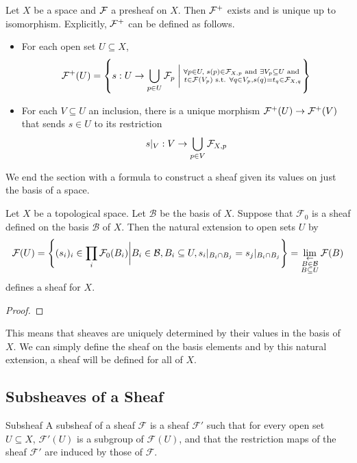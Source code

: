 \documentclass[a4paper]{article}
\begin{document}
\begin{thm}{}{} Let $X$ be a space and $\mathcal{F}$ a presheaf on $X$. Then $\mathcal{F}^+$ exists and is unique up to isomorphism. Explicitly, $\mathcal{F}^+$ can be defined as follows. 
\begin{itemize}
\item For each open set $U\subseteq X$, $$\mathcal{F}^+(U)=\left\{s:U\to\bigcup_{p\in U}\mathcal{F}_p\;\bigg{|}\;\substack{\forall p\in U,\;s(p)\in\mathcal{F}_{X,p}\text{ and }\exists V_p\subseteq U\text{ and }\\t\in\mathcal{F}(V_p)\text{ s.t. }\forall q\in V_p, s(q)=t_q\in\mathcal{F}_{X,q}}\right\}$$
\item For each $V\subseteq U$ an inclusion, there is a unique morphism $\mathcal{F}^+(U)\to\mathcal{F}^+(V)$ that sends $s\in U$ to its restriction $$s|_V:V\to\bigcup_{p\in V}\mathcal{F}_{X,p}$$
\end{itemize}
\end{thm}

We end the section with a formula to construct a sheaf given its values on just the basis of a space. 

\begin{thm}{}{} Let $X$ be a topological space. Let $\mathcal{B}$ be the basis of $X$. Suppose that $\mathcal{F}_0$ is a sheaf defined on the basis $\mathcal{B}$ of $X$. Then the natural extension to open sets $U$ by $$\mathcal{F}(U)=\left\{(s_i)_i\in\prod_i\mathcal{F}_0(B_i)\bigg{|}B_i\in\mathcal{B}, B_i\subseteq U, s_i|_{B_i\cap B_j}=s_j|_{B_i\cap B_j}\right\}=\lim_{\substack{\leftarrow\\B\in\mathcal{B}\\B\subseteq U}}\mathcal{F}(B)$$ defines a sheaf for $X$. \tcbline
\begin{proof}

\end{proof}
\end{thm}

This means that sheaves are uniquely determined by their values in the basis of $X$. We can simply define the sheaf on the basis elements and by this natural extension, a sheaf will be defined for all of $X$. 

\subsection{Subsheaves of a Sheaf}
\begin{defn}{Subsheaf}{} A subsheaf of a sheaf $\mathcal{F}$ is a sheaf $\mathcal{F}'$ such that for every open set $U\subseteq X$, $\mathcal{F}'(U)$ is a subgroup of $\mathcal{F}(U)$, and that the restriction maps of the sheaf $\mathcal{F}'$ are induced by those of $\mathcal{F}$. 
\end{defn}
\end{document}
